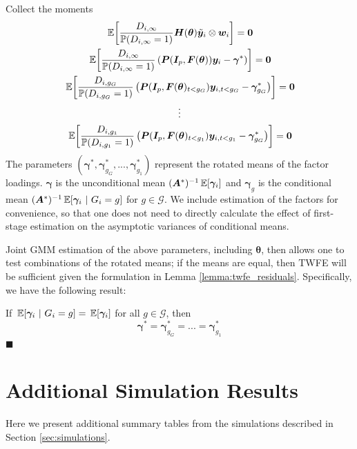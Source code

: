 \documentclass[12pt]{article}
\begin{document}
Collect the moments 
\begin{gather*}
    \expec{\frac{D_{i, \infty}}{\mathbb{P}(D_{i, \infty} = 1)}\bm H(\bm{\theta}) \tilde{\bm y}_i \otimes \bm w_i} = \bm 0\\
    \expec{\frac{D_{i, \infty}}{\mathbb{P}(D_{i, \infty} = 1)} \left( \bm P(\bm I_p, \bm{F}(\bm{\theta})) \bm y_i - \bm \gamma^* \right)} = \bm 0\\
    \expec{\frac{D_{i, g_G}}{\mathbb{P}(D_{i,g_G} = 1)} \left( \bm P(\bm I_p, \bm{F}(\bm{\theta})_{t < g_G}) \bm y_{i,t < g_G} - \bm \gamma_{g_G}^* \right) } = \bm 0\\
    \vdots\\
    \expec{\frac{D_{i, g_1}}{\mathbb{P}(D_{i,g_1} = 1)} \left( \bm P(\bm I_p, \bm{F}(\bm{\theta})_{t < g_1}) \bm y_{i,t < g_1} - \bm \gamma_{g_G}^* \right) } = \bm 0
\end{gather*}
The parameters $(\bm \gamma^*, \bm \gamma_{g_G}^*,...,\bm \gamma_{g_1}^*)$ represent the rotated means of the factor loadings. $\bm \gamma$ is the unconditional mean $(\bm A^*)^{-1}\expec{\bm \gamma_i}$ and $\bm \gamma_g$ is the conditional mean $(\bm A^*)^{-1}\expec{\bm \gamma_i}{G_i = g}$ for $g \in \mathcal{G}$. We include estimation of the factors for convenience, so that one does not need to directly calculate the effect of first-stage estimation on the asymptotic variances of conditional means. 

Joint GMM estimation of the above parameters, including $\bm{\theta}$, then allows one to test combinations of the rotated means; if the means are equal, then TWFE will be sufficient given the formulation in Lemma \ref{lemma:twfe_residuals}. Specifically, we have the following result: 
\begin{theorem}
    If $\expec{\bm \gamma_i}{G_i = g} = \expec{\bm \gamma_i}$ for all $g \in \mathcal{G}$, then
    \begin{equation}
        \bm \gamma^* = \bm \gamma_{g_G}^* = ... = \bm \gamma_{g_1}^*
    \end{equation}
    $\blacksquare$
\end{theorem}


\section{Additional Simulation Results}\label{sec:simulations_additional}

Here we present additional summary tables from the simulations described in Section \ref{sec:simulations}. 
\end{document}
